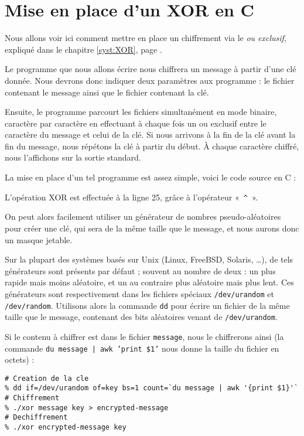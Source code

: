 \chapter{Mise en place d'un XOR en C}
\thispagestyle{empty}
Nous allons voir ici comment mettre en place un chiffrement via le
\emph{ou exclusif}, expliqué dans le chapitre \ref{syst:XOR}, page
\pageref{syst:XOR}.

Le programme que nous allons écrire nous chiffrera un message à partir
d'une clé donnée. Nous devrons donc indiquer deux paramètres aux
programme : le fichier contenant le message ainsi que le fichier
contenant la clé.

Ensuite, le programme parcourt les fichiers simultanément en mode
binaire, caractère par caractère en effectuant à chaque fois un ou
exclusif entre le caractère du message et celui de la clé. Si nous
arrivons à la fin de la clé avant la fin du message, nous répétons la
clé à partir du début. À chaque caractère chiffré, nous l'affichons
sur la sortie standard.

La mise en place d'un tel programme est assez simple, voici le code
source en C : 
\lstset{language=C}


L'opération XOR est effectuée à la ligne 25, grâce à l'opérateur
«~\texttt{\^}~».

On peut alors facilement utiliser un générateur de nombres
pseudo-aléatoires pour créer une clé, qui sera de la même taille que
le message, et nous aurons donc un masque jetable.

Sur la plupart des systèmes basés sur Unix (Linux, FreeBSD, Solaris,
\dots), de tels générateurs sont présents par défaut ; souvent au
nombre de deux : un plus rapide mais moins aléatoire, et un au
contraire plus aléatoire mais plus lent. Ces générateurs sont
respectivement dans les fichiers spéciaux \texttt{/dev/urandom} et
\texttt{/dev/random}. Utilisons alors la commande \texttt{dd} pour
écrire un fichier de la même taille que le message, contenant des bits
aléatoires venant de \texttt{/dev/urandom}.

Si le contenu à chiffrer est dans le fichier \texttt{message}, nous le
chiffrerons ainsi (la commande \texttt{du message | awk '{print \$1}'}
nous donne la taille du fichier en octets) : 
\lstset{language=csh}
\begin{lstlisting}
# Creation de la cle
% dd if=/dev/urandom of=key bs=1 count=`du message | awk '{print $1}'`
# Chiffrement
% ./xor message key > encrypted-message
# Dechiffrement
% ./xor encrypted-message key 
\end{lstlisting}

